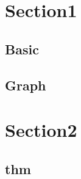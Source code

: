 \section{Section1}
    \subsection{Basic}
        
    \subsection{Graph}
        

\section{Section2}
    \subsection{thm}
        